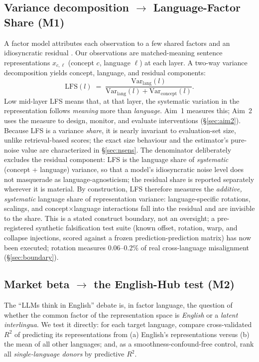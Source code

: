 \documentclass[11pt,a4paper]{article}
\begin{document}
\subsection{Variance decomposition $\to$ Language-Factor Share (M1)}
A factor model attributes each observation to a few shared factors and an
idiosyncratic residual \citep{ross1976apt,fama1993factors}. Our observations are matched-meaning
sentence representations $x_{c,\ell}$ (concept $c$, language $\ell$) at each
layer. A two-way variance decomposition yields concept, language, and residual
components:
\[
\mathrm{LFS}(l) \;=\;
\frac{\mathrm{Var}_{\mathrm{lang}}(l)}{\mathrm{Var}_{\mathrm{lang}}(l) +
\mathrm{Var}_{\mathrm{concept}}(l)} .
\]
Low mid-layer LFS means that, at that layer, the systematic variation in the
representation follows \emph{meaning} more than \emph{language}. Aim~1
measures this; Aim~2 uses the measure to design, monitor, and evaluate
interventions (\S\ref{sec:aim2}).
Because LFS is a variance \emph{share}, it is nearly invariant to
evaluation-set size, unlike retrieval-based scores; the exact size
behaviour and the estimator's pure-noise value are characterized in
\S\ref{sec:nsens}. The denominator
deliberately excludes the residual component: LFS is the language share of
\emph{systematic} (concept + language) variance, so that a model's
idiosyncratic noise level does not masquerade as language-agnosticism;
the residual share is reported separately wherever it is material.
By construction, LFS therefore measures the \emph{additive, systematic}
language share of representation variance: language-specific rotations,
scalings, and concept$\times$language interactions fall into the residual
and are invisible to the share. This is a stated construct boundary, not an
oversight; a pre-registered synthetic falsification test suite (known
offset, rotation, warp, and collapse injections, scored against a frozen
prediction-prediction matrix) has now been executed; rotation measures
0.06--0.2\% of real cross-language misalignment (\S\ref{sec:boundary}).

\subsection{Market beta $\to$ the English-Hub test (M2)}
The ``LLMs think in English'' debate \citep{wendler2024llamas} is, in factor
language, the question of whether the common factor of the representation
space is \emph{English} or a \emph{latent interlingua}. We test it directly:
for each target language, compare cross-validated $R^2$ of predicting its
representations from (a) English's representations versus (b) the mean of all
other languages; and, as a smoothness-confound-free control, rank all
\emph{single-language donors} by predictive $R^2$.
\end{document}
